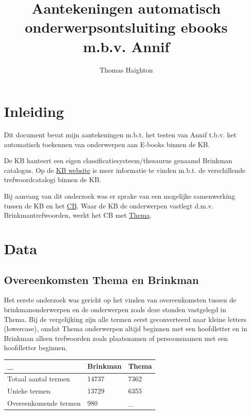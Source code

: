 \documentclass{article}
\title{Aantekeningen automatisch onderwerpsontsluiting ebooks m.b.v. Annif}
\author{Thomas Haighton}
\begin{document}
\maketitle

\clearpage

\tableofcontents

\clearpage

\section{Inleiding}
Dit document bevat mijn aantekeningen m.b.t. het testen van Annif t.b.v. het automatisch toekennen van onderwerpen aan E-books binnen de KB. 

De KB hanteert een eigen classificatiesysteem/thesaurus genaamd Brinkman catalogus. Op de \href{https://www.kb.nl/bronnen-zoekwijzers/zoekwijzers/meer-informatie-over-zoeken/trefwoorden-in-de-kb-catalogus}{KB website} is meer informatie te vinden m.b.t. de verschillende trefwoordcatalogi binnen de KB.

Bij aanvang van dit onderzoek was er sprake van een mogelijke samenwerking tussen de KB en het \href{https://www.cb.nl}{CB}. Waar de KB de onderwerpen vastlegt d.m.v. Brinkmantrefwoorden, werkt het CB met \href{https://www.editeur.org/151/Thema/}{Thema}.

\section{Data}

\subsection{Overeenkomsten Thema en Brinkman}

Het eerste onderzoek was gericht op het vinden van overeenkomsten tussen de brinkmanonderwerpen en de onderwerpen zoals deze stonden vastgelegd in Thema. Bij de vergelijking zijn alle termen eerst geconverteerd naar kleine letters (lowercase), omdat Thema onderwerpen altijd beginnen met een hoofdletter en in Brinkman alleen trefwoorden zoals plaatsnamen of persoonsnamen met een hoofdletter beginnen.
\\

\begin{tabular}{|l|l|l|}
\hline
\_                    & Brinkman  & Thema \\
\hline
Totaal aantal termen  & 14737     & 7362 \\
Unieke termen         & 13729     & 6355 \\
Overeenkomende termen & 980       & \_   \\
\hline
\end{tabular}
\end{document}
